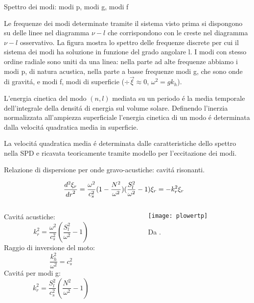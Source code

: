 \documentclass[10pt,xcolor={usenames},fleqn,mathserif,serif]{beamer}
\begin{document}
\begin{wordonframe}{Spettro dei modi: modi p, modi g, modi f}

Le frequenze dei modi determinate tramite il sistema visto prima si dispongono su delle linee nel diagramma $\nu-l$ che corrispondono con le creste nel diagramma $\nu-l$ osservativo.
La figura mostra lo spettro delle frequenze discrete per cui il sistema dei modi ha soluzione in funzione del grado angolare l. I modi con stesso ordine radiale sono uniti da una linea: nella parte ad alte frequenze abbiamo i modi p, di natura acustica, nella parte a basse frequenze modi g, che sono onde di gravit\'a, e modi f, modi di superficie ($\div{\vec{\xi}}\approx0$, $\omega^2=gk_h$). 

L'energia cinetica del modo $(n,l)$ mediata su un periodo \'e la media temporale dell'integrale della densit\'a di energia sul volume solare. Definendo l'inerzia normalizzata all'ampiezza superficiale l'energia cinetica di un modo \'e determinata dalla velocit\'a quadratica media in superficie.

La velocit\'a quadratica media \'e determinata dalle caratteristiche dello spettro nella SPD e ricavata teoricamente tramite modello per l'eccitazione dei modi.

\end{wordonframe}


\begin{frame}{Relazione di dispersione per onde gravo-acustiche: cavit\'a risonanti.}


\begin{align*}
&\TtwoDy{r}{\xi_r}=\frac{\omega^2}{c_s^2}(1-\frac{N^2}{\omega^2})(\frac{S_l^2}{\omega^2}-1)\xi_r=-k_r^2\xi_r
\end{align*}

\begin{columns}

\begin{column}{0.4\textwidth}
Cavit\'a acustiche:\[k_r^2=\frac{\omega^2}{c_s^2}(\frac{S_l^2}{\omega^2}-1)\]
Raggio di inversione del moto:\[\frac{k_h^2}{\omega^2}=c_s^2\]
Cavit\'a per modi g:\[k_r^2=\frac{S_l^2}{c_s^2}(\frac{N^2}{\omega^2}-1)\]

\end{column}

\begin{column}{0.6\textwidth}

\begin{figure}[!ht]
\centering
\texttt{[image: plowertp]}
\caption{Da \cite{dal03notes}.}\label{fig:plowertp}
\end{figure}

\end{column}

\end{columns}

\end{frame}
\end{document}
